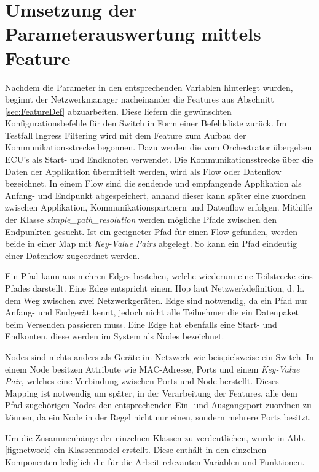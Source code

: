 \section{Umsetzung der Parameterauswertung mittels Feature}\label{sec:Auswertung}
Nachdem die Parameter in den entsprechenden Variablen hinterlegt wurden, beginnt der Netzwerkmanager nacheinander die Features aus Abschnitt \ref{sec:FeatureDef} abzuarbeiten. Diese liefern die gewünschten Konfigurationsbefehle für den Switch in Form einer Befehlsliste zurück. Im Testfall Ingress Filtering wird mit dem Feature zum Aufbau der Kommunikationsstrecke begonnen. Dazu werden die vom Orchestrator übergeben \ac{ECU}'s als Start- und Endknoten verwendet. Die Kommunikationsstrecke über die Daten der Applikation übermittelt werden, wird als Flow oder Datenflow bezeichnet. In einem Flow sind die sendende und empfangende Applikation als Anfang- und Endpunkt abgespeichert, anhand dieser kann später eine zuordnen zwischen Applikation, Kommunikationspartnern und Datenflow erfolgen. Mithilfe der Klasse \emph{simple\_path\_resolution} werden mögliche Pfade zwischen den Endpunkten gesucht. Ist ein geeigneter Pfad für einen Flow gefunden, werden beide in einer Map mit \emph{Key-Value Pairs} abgelegt. So kann ein Pfad eindeutig einer Datenflow zugeordnet werden. 

Ein Pfad kann aus mehren Edges bestehen, welche wiederum eine Teilstrecke eins Pfades darstellt. Eine Edge entspricht einem Hop laut Netzwerkdefinition, d. h. dem Weg zwischen zwei Netzwerkgeräten. Edge sind notwendig, da ein Pfad nur Anfang- und Endgerät kennt, jedoch nicht alle Teilnehmer die ein Datenpaket beim Versenden passieren muss. Eine Edge hat ebenfalls eine Start- und Endkonten, diese werden im System als Nodes bezeichnet.

Nodes sind nichts anders als Geräte im Netzwerk wie beispielsweise ein Switch. In einem Node besitzen Attribute wie \ac{MAC}-Adresse, Ports und einem \emph{Key-Value Pair}, welches eine Verbindung zwischen Ports und Node herstellt. Dieses Mapping ist notwendig um später, in der Verarbeitung der Features, alle dem Pfad zugehörigen Nodes den entsprechenden Ein- und Ausgangsport zuordnen zu können, da ein Node in der Regel nicht nur einen, sondern mehrere Ports besitzt. 

Um die Zusammenhänge der einzelnen Klassen zu verdeutlichen, wurde in Abb. \ref{fig:network} ein Klassenmodel erstellt. Diese enthält in den einzelnen Komponenten lediglich die für die Arbeit relevanten Variablen und Funktionen.

